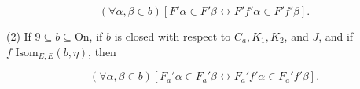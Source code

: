 $$(\forall \alpha, \beta \in b) [F' \alpha \in F' \beta \leftrightarrow F' f' \alpha \in F' f' \beta].$$

(2) If $9 \subseteq b \subseteq \text{On}$, if $b$ is closed with respect to $C_a, K_1, K_2$, and $J$, and if $f \text{ Isom}_{E, E}(b, \eta)$, then

$$(\forall \alpha, \beta \in b) [F_a' \alpha \in F_a' \beta \leftrightarrow F_a' f' \alpha \in F_a' f' \beta].$$
